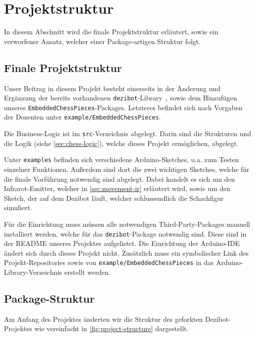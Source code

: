 
\section{Projektstruktur}

In diesem Abschnitt wird die finale Projektstruktur erläutert, sowie ein verworfener Ansatz, welcher einer Package-artigen Struktur folgt.


\subsection{Finale Projektstruktur}
\label{sec:final-project-structure}

Unser Beitrag in diesem Projekt besteht einerseits in der Änderung und Ergänzung der bereits vorhandenen \texttt{dezibot}-Library~\cite{dezibotteamDezibotDezibot2025}, sowie dem Hinzufügen unseres \texttt{EmbeddedChessPieces}-Packages. Letzteres befindet sich nach Vorgaben der Dozenten unter \texttt{example/EmbeddedChessPieces}.

Die Business-Logic ist im \texttt{src}-Verzeichnis abgelegt. Darin sind die Strukturen und die Logik (siehe \autoref{sec:chess-logic}), welche dieses Projekt ermöglichen, abgelegt.

Unter \texttt{examples} befinden sich verschiedene Arduino-Sketches, u.a. zum Testen einzelner Funktionen. Außerdem sind dort die zwei wichtigen Sketches, welche für die finale Vorführung notwendig sind abgelegt. Dabei handelt es sich um den Infrarot-Emitter, welcher in \autoref{sec:movement-ir} erläutert wird, sowie um den Sketch, der auf dem Dezibot läuft, welcher schlussendlich die Schachfigur simuliert.

Für die Einrichtung muss müssen alle notwendigen Third-Party-Packages manuell installiert werden, welche für das \texttt{dezibot}-Package notwendig sind. Diese sind in der README unseres Projektes aufgelistet. Die Einrichtung der Arduino-IDE ändert sich durch dieses Projekt nicht. Zusätzlich muss ein symbolischer Link des Projekt-Repositories sowie von \texttt{example/EmbeddedChessPieces} in das Arduino-Library-Verzeichnis erstellt werden.


\subsection{Package-Struktur}

Am Anfang des Projektes änderten wir die Struktur des geforkten Dezibot-Projektes wie vereinfacht in \autoref{fig:project-structure} dargestellt.

